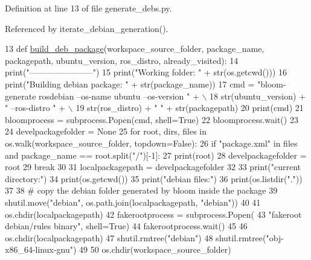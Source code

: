 Definition at line 13 of file generate\+\_\+debs.\+py.



Referenced by iterate\+\_\+debian\+\_\+generation().


\begin{DoxyCode}
13 \textcolor{keyword}{def }\hyperlink{namespacegenerate__debs_aa70c3f4917ddc57b13eaed8501f571a8}{build\_deb\_package}(workspace\_source\_folder, package\_name, packagepath, ubuntu\_version, 
      ros\_distro, already\_visited):
14     print(\textcolor{stringliteral}{"-----------------------"})
15     print(\textcolor{stringliteral}{"Working folder: "} + str(os.getcwd()))
16     print(\textcolor{stringliteral}{"Building debian package: "} + str(package\_name))
17     cmd = \textcolor{stringliteral}{"bloom-generate rosdebian --os-name ubuntu --os-version "} + \(\backslash\)
18         str(ubuntu\_version) + \textcolor{stringliteral}{" --ros-distro "} + \(\backslash\)
19         str(ros\_distro) + \textcolor{stringliteral}{" "} + str(packagepath)
20     print(cmd)
21     bloomprocess = subprocess.Popen(cmd, shell=\textcolor{keyword}{True})
22     bloomprocess.wait()
23 
24     develpackagefolder = \textcolor{keywordtype}{None}
25     \textcolor{keywordflow}{for} root, dirs, files \textcolor{keywordflow}{in} os.walk(workspace\_source\_folder, topdown=\textcolor{keyword}{False}):
26         \textcolor{keywordflow}{if} \textcolor{stringliteral}{"package.xml"} \textcolor{keywordflow}{in} files \textcolor{keywordflow}{and} package\_name == root.split(\textcolor{stringliteral}{"/"})[-1]:
27             print(root)
28             develpackagefolder = root
29             \textcolor{keywordflow}{break}
30 
31     localpackagepath = develpackagefolder
32 
33     print(\textcolor{stringliteral}{"current directory:"})
34     print(os.getcwd())
35     print(\textcolor{stringliteral}{"debian files:"})
36     print(os.listdir(\textcolor{stringliteral}{"."}))
37 
38     \textcolor{comment}{# copy the debian folder generated by bloom inside the package}
39     shutil.move(\textcolor{stringliteral}{"debian"}, os.path.join(localpackagepath, \textcolor{stringliteral}{"debian"}))
40 
41     os.chdir(localpackagepath)
42     fakerootprocess = subprocess.Popen(
43         \textcolor{stringliteral}{"fakeroot debian/rules binary"}, shell=\textcolor{keyword}{True})
44     fakerootprocess.wait()
45 
46     os.chdir(localpackagepath)
47     shutil.rmtree(\textcolor{stringliteral}{"debian"})
48     shutil.rmtree(\textcolor{stringliteral}{"obj-x86\_64-linux-gnu"})
49 
50     os.chdir(workspace\_source\_folder)

\end{DoxyCode}
